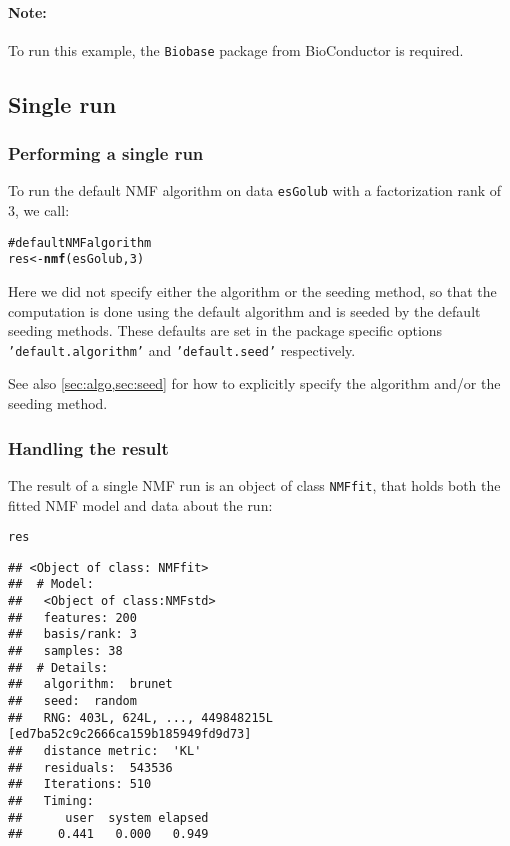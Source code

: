 \documentclass[a4paper]{article}\usepackage{graphicx, color}
\makeatletter
\newcommand{\hlfunctioncall}[1]{\textcolor[rgb]{0.501960784313725,0,0.329411764705882}{\textbf{#1}}}%
\newcommand{\hlcomment}[1]{\textcolor[rgb]{0.180392156862745,0.6,0.341176470588235}{#1}}%
\newenvironment{kframe}{%
 \def\at@end@of@kframe{}%
 \ifinner\ifhmode%
  \def\at@end@of@kframe{\end{minipage}}%
  \begin{minipage}{\columnwidth}%
 \fi\fi%
 \def\FrameCommand##1{\hskip\@totalleftmargin \hskip-\fboxsep
 \colorbox{shadecolor}{##1}\hskip-\fboxsep
     \hskip-\linewidth \hskip-\@totalleftmargin \hskip\columnwidth}%
 \MakeFramed {\advance\hsize-\width
   \@totalleftmargin\z@ \linewidth\hsize
   \@setminipage}}%
 {\par\unskip\endMakeFramed%
 \at@end@of@kframe}
\newenvironment{knitrout}{}{} %
\let\code=\texttt
\makeatother
\begin{document}

\paragraph{Note:} To run this example, the \code{Biobase} package from BioConductor is required.

\subsection{Single run}\label{sec:single_run}

\subsubsection{Performing a single run}
To run the default NMF algorithm on data \code{esGolub} with a factorization rank of 3, we call: 

\begin{knitrout}
\color{fgcolor}\begin{kframe}
\begin{alltt}
\hlcomment{# default NMF algorithm}
res <- \hlfunctioncall{nmf}(esGolub, 3)
\end{alltt}
\end{kframe}
\end{knitrout}


Here we did not specify either the algorithm or the seeding method, so that the computation is done using the default algorithm and is seeded by the 
default seeding methods.
These defaults are set in the package specific options \code{'default.algorithm'} 
and \code{'default.seed'} respectively.

See also \cref{sec:algo,sec:seed} for how to explicitly specify the algorithm and/or the seeding method.

\subsubsection{Handling the result}

The result of a single NMF run is an object of class \code{NMFfit}, that holds both the fitted NMF model and data about the run:

\begin{knitrout}
\color{fgcolor}\begin{kframe}
\begin{alltt}
res
\end{alltt}
\begin{verbatim}
## <Object of class: NMFfit>
##  # Model:
##   <Object of class:NMFstd>
##   features: 200 
##   basis/rank: 3 
##   samples: 38 
##  # Details:
##   algorithm:  brunet 
##   seed:  random 
##   RNG: 403L, 624L, ..., 449848215L [ed7ba52c9c2666ca159b185949fd9d73]
##   distance metric:  'KL' 
##   residuals:  543536 
##   Iterations: 510 
##   Timing:
##      user  system elapsed 
##     0.441   0.000   0.949
\end{verbatim}
\end{kframe}
\end{knitrout}
\end{document}
